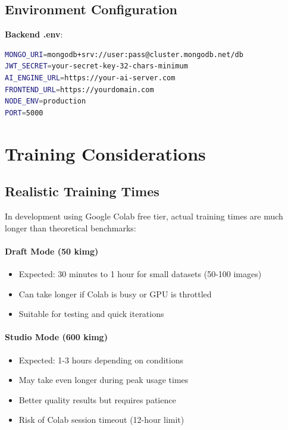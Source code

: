 \documentclass[11pt,a4paper]{article}
\begin{document}
\subsection{Environment Configuration}

\textbf{Backend .env}:
\begin{lstlisting}[language=bash]
MONGO_URI=mongodb+srv://user:pass@cluster.mongodb.net/db
JWT_SECRET=your-secret-key-32-chars-minimum
AI_ENGINE_URL=https://your-ai-server.com
FRONTEND_URL=https://yourdomain.com
NODE_ENV=production
PORT=5000
\end{lstlisting}

\section{Training Considerations}

\subsection{Realistic Training Times}

In development using Google Colab free tier, actual training times are much longer than theoretical benchmarks:

\paragraph{Draft Mode (50 kimg)}
\begin{itemize}[noitemsep]
    \item Expected: 30 minutes to 1 hour for small datasets (50-100 images)
    \item Can take longer if Colab is busy or GPU is throttled
    \item Suitable for testing and quick iterations
\end{itemize}

\paragraph{Studio Mode (600 kimg)}
\begin{itemize}[noitemsep]
    \item Expected: 1-3 hours depending on conditions
    \item May take even longer during peak usage times
    \item Better quality results but requires patience
    \item Risk of Colab session timeout (12-hour limit)
\end{itemize}
\end{document}
